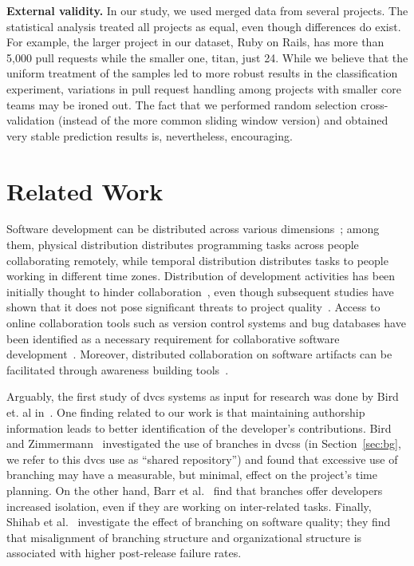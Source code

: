 \documentclass{sig-alternate}
\begin{document}
\textbf{External validity.}
In our study, we used merged data from several projects. The statistical
analysis treated all projects as equal, even though differences do exist.
For example, the larger project in our dataset, Ruby on Rails, 
has more than 5,000 pull requests while the smaller one, \textsf{titan}, just 24.
While we believe that the uniform treatment of the samples led to more robust
results in the classification experiment, variations in pull request
handling among projects with smaller core teams may be ironed out.
The fact that we performed random selection cross-validation (instead
of the more common sliding window version) and obtained very stable prediction
results is, nevertheless, encouraging.

\section{Related Work}

Software development can be distributed across various
di\-men\-sions~\cite{Gumm06}; among them, physical distribution distributes
programming tasks across people collaborating remotely, while temporal
distribution distributes tasks to people working in different time zones.
Distribution of development activities has been initially thought to hinder
collaboration~\cite{Herbs99, Batti01}, even though subsequent studies have
shown that it does not pose significant threats to project
quality~\cite{Spine06, Nguye08, Bird09a}. Access to online collaboration tools
such as version control systems and bug databases have been identified as a necessary
requirement for collaborative software development~\cite{Catal06}. Moreover, distributed collaboration on software artifacts can be
facilitated through awareness building tools~\cite{Dabbi12, Lanza10}. 

Arguably, the first study of {\sc dvcs} systems as input for research was done
by Bird et. al in~\cite{Bird09}. One finding related to our work is that
maintaining authorship information leads to better identification of the
developer's contributions. Bird and Zimmermann~\cite{Bird12} investigated the
use of branches in {\sc dvcs}s (in Section~\ref{sec:bg}, we refer to this {\sc
dvcs} use as ``shared repository'') and found that excessive use of branching
may have a measurable, but minimal, effect on the project's time planning.
On the other hand, Barr et al.~\cite{Barr12} find that branches offer developers
increased isolation, even if they are working on inter-related tasks.
Finally, Shihab et al.~\cite{Shiha12} investigate the effect of branching on
software quality; they find that misalignment of branching structure and organizational structure is associated with higher post-release failure rates.
\end{document}
